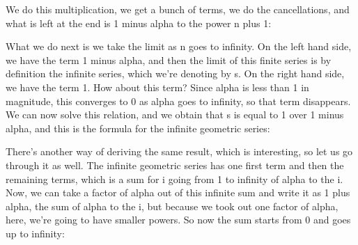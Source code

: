 \documentclass[pdftex, brazil, 12pt, twoside]{article}
\begin{document}
We do this multiplication, we get a bunch of terms, we do
the cancellations, and what is left at the end is 1 minus
alpha to the power n plus 1:

\begin{figure}[H]
  \begin{center}
  \end{center}
\end{figure}

What we do next is we take the limit as n goes to infinity.
On the left hand side, we have the term 1 minus alpha, and
then the limit of this finite series is by definition the
infinite series, which we're denoting by s.
On the right hand side, we have the term 1.
How about this term?
Since alpha is less than 1 in magnitude, this converges to 0
as alpha goes to infinity, so that term disappears.
We can now solve this relation, and we obtain that s
is equal to 1 over 1 minus alpha, and this is the formula
for the infinite geometric series:

\begin{figure}[H]
  \begin{center}
  \end{center}
\end{figure}

There's another way of deriving the same result,
which is interesting, so let us go through it as well.
The infinite geometric series has one first term and then
the remaining terms, which is a sum for i going from 1 to
infinity of alpha to the i.
Now, we can take a factor of alpha out of this infinite sum
and write it as 1 plus alpha, the sum of alpha to the i, but
because we took out one factor of alpha, here, we're going to
have smaller powers.
So now the sum starts from 0 and goes up to infinity:
\end{document}
